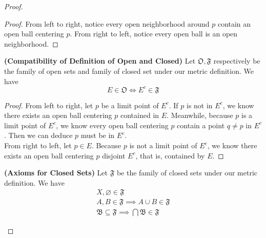 \documentclass{report}
\begin{document}
\begin{proof}
\begin{theorem}
\end{theorem}
\begin{proof}
From left to right, notice every open neighborhood around $p$ contain an open ball centering $p$. From right to left, notice every open ball is an open neighborhood.
\end{proof}
\begin{theorem}
\label{1.6.5}
\textbf{(Compatibility of Definition of Open and Closed)} 
Let $\mathfrak{O},\mathfrak{F}$ respectively be the family of open sets and family of closed set under our metric definition. We have
\begin{equation}
E\in \mathfrak{O}\iff E^c\in\mathfrak{F}
\end{equation}
\end{theorem}
\begin{proof}
From left to right, let $p$ be a limit point of $E^c$. If $p$ is not in $E^c$, we know there exists an open ball centering  $p$ contained in $E$. Meanwhile, because  $p$ is a limit point of $E^c$, we know every open ball centering $p$ contain a point $q\neq p$ in $E^c$. Then we can deduce $p$ must be in $E^c$.\\

From right to left, let $p\in E$. Because $p$ is not a limit point of $E^c$, we know there exists an open ball centering $p$ disjoint $E^c$, that is, contained by  $E$.
\end{proof}
\begin{corollary}
\label{1.6.6}
\textbf{(Axioms for Closed Sets)} Let $\mathfrak{F}$ be the family of closed sets under our metric definition. We have
\begin{gather}
X,\varnothing \in \mathfrak{F}\\
A,B\in\mathfrak{F}\implies A\cup  B\in\mathfrak{F}\\
\mathfrak{B}\subseteq \mathfrak{F}\implies \bigcap \mathfrak{B}\in \mathfrak{F}
\end{gather}
\end{corollary}
\end{proof}
\end{document}
